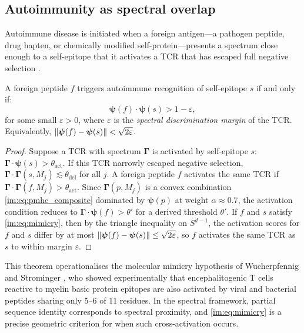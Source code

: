 \subsection{Autoimmunity as spectral overlap}
\label{im:sec:autoimmunity}

Autoimmune disease is initiated when a foreign antigen---a pathogen peptide,
drug hapten, or chemically modified self-protein---presents a spectrum close
enough to a self-epitope that it activates a TCR that has escaped full
negative selection \citep{wucherpfennig1995}.

\begin{theorem}
\label{im:thm:molecular_mimicry}
A foreign peptide $f$ triggers autoimmune recognition of self-epitope $s$
if and only if:
\begin{equation}
  \bm{\psi}(f)\cdot\bm{\psi}(s) > 1 - \varepsilon,
  \label{im:eq:mimicry}
\end{equation}
for some small $\varepsilon > 0$, where $\varepsilon$ is the
\emph{spectral discrimination margin} of the TCR. Equivalently,
$\norm{\bm{\psi}(f) - \bm{\psi}(s)} < \sqrt{2\varepsilon}$.
\end{theorem}

\begin{proof}
Suppose a TCR with spectrum $\bm{\Gamma}$ is activated by self-epitope $s$:
$\bm{\Gamma}\cdot\bm{\psi}(s) > \theta_{\mathrm{act}}$. If this TCR narrowly
escaped negative selection,
$\bm{\Gamma}\cdot\bm{\Gamma}(s, M_j) \lesssim \theta_{\mathrm{del}}$
for all $j$. A foreign peptide $f$ activates the same TCR if
$\bm{\Gamma}\cdot\bm{\Gamma}(f, M_j) > \theta_{\mathrm{act}}$. Since
$\bm{\Gamma}(p, M_j)$ is a convex combination \eqref{im:eq:pmhc_composite}
dominated by $\bm{\psi}(p)$ at weight $\alpha \approx 0.7$, the activation
condition reduces to $\bm{\Gamma}\cdot\bm{\psi}(f) > \theta'$ for a derived
threshold $\theta'$. If $f$ and $s$ satisfy \eqref{im:eq:mimicry}, then by the
triangle inequality on $S^{d-1}$, the activation scores for $f$ and $s$
differ by at most $\norm{\bm{\psi}(f) - \bm{\psi}(s)} \leq \sqrt{2\varepsilon}$,
so $f$ activates the same TCR as $s$ to within margin $\varepsilon$.
\end{proof}

\begin{remark}
This theorem operationalises the molecular mimicry hypothesis of Wucherpfennig
and Strominger \citep{wucherpfennig1995}, who showed experimentally that
encephalitogenic T cells reactive to myelin basic protein epitopes are also
activated by viral and bacterial peptides sharing only 5--6 of 11 residues.
In the spectral framework, partial sequence identity corresponds to spectral
proximity, and \eqref{im:eq:mimicry} is a precise geometric criterion for when
such cross-activation occurs.
\end{remark}

